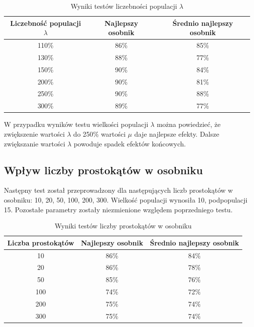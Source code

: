 \begin{table}[H]
    \centering
    \begin{tabular}{|c|c|c|}
    \hline
    Liczebność populacji $\lambda$  & Najlepszy osobnik & Średnio najlepszy osobnik \\ \hline
    110\%                           & 86\%              & 85\%                      \\ \hline
    130\%                           & 88\%              & 77\%                      \\ \hline
    150\%                           & 90\%              & 84\%                      \\ \hline
    200\%                           & 90\%              & 81\%                      \\ \hline
    250\%                           & 90\%              & 88\%                      \\ \hline
    300\%                           & 89\%              & 77\%                      \\ \hline
    \end{tabular}
    \caption{Wyniki testów liczebności populacji $\lambda$}
    \label{tab:crossing}
\end{table}

W przypadku wyników testu wielkości populacji $\lambda$ można powiedzieć, że zwiększenie wartości $\lambda$ do 250\% wartości $\mu$ daje najlepsze efekty. Dalsze zwiększanie wartości $\lambda$ powoduje spadek efektów końcowych.

\subsection*{Wpływ liczby prostokątów w osobniku}
Następny test został przeprowadzony dla następujących liczb prostokątów w osobniku: 10, 20, 50, 100, 200, 300. Wielkość populacji wynosiła 10, podpopulacji 15. Pozostałe parametry zostały niezmienione względem poprzedniego testu. 

\begin{table}[H]
    \centering
    \begin{tabular}{|c|c|c|}
    \hline
    Liczba prostokątów     & Najlepszy osobnik & Średnio najlepszy osobnik \\ \hline
    10                      & 86\%              & 84\%                      \\ \hline
    20                      & 86\%              & 78\%                      \\ \hline
    50                      & 85\%              & 76\%                      \\ \hline
    100                     & 74\%              & 72\%                      \\ \hline
    200                     & 75\%              & 74\%                      \\ \hline
    300                     & 75\%              & 74\%                      \\ \hline
    \end{tabular}
    \caption{Wyniki testów liczby prostokątów w osobniku}
    \label{tab:crossing}
\end{table}

